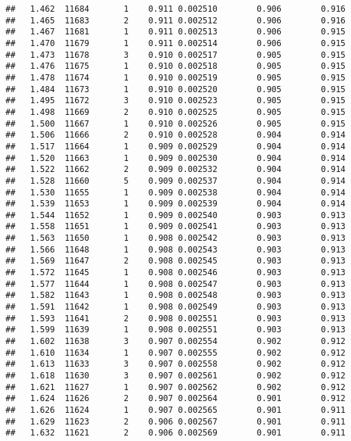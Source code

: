 \documentclass[
]{book}
\begin{document}
\begin{verbatim}
##   1.462  11684       1    0.911 0.002510        0.906        0.916
##   1.465  11683       2    0.911 0.002512        0.906        0.916
##   1.467  11681       1    0.911 0.002513        0.906        0.915
##   1.470  11679       1    0.911 0.002514        0.906        0.915
##   1.473  11678       3    0.910 0.002517        0.905        0.915
##   1.476  11675       1    0.910 0.002518        0.905        0.915
##   1.478  11674       1    0.910 0.002519        0.905        0.915
##   1.484  11673       1    0.910 0.002520        0.905        0.915
##   1.495  11672       3    0.910 0.002523        0.905        0.915
##   1.498  11669       2    0.910 0.002525        0.905        0.915
##   1.500  11667       1    0.910 0.002526        0.905        0.915
##   1.506  11666       2    0.910 0.002528        0.904        0.914
##   1.517  11664       1    0.909 0.002529        0.904        0.914
##   1.520  11663       1    0.909 0.002530        0.904        0.914
##   1.522  11662       2    0.909 0.002532        0.904        0.914
##   1.528  11660       5    0.909 0.002537        0.904        0.914
##   1.530  11655       1    0.909 0.002538        0.904        0.914
##   1.539  11653       1    0.909 0.002539        0.904        0.914
##   1.544  11652       1    0.909 0.002540        0.903        0.913
##   1.558  11651       1    0.909 0.002541        0.903        0.913
##   1.563  11650       1    0.908 0.002542        0.903        0.913
##   1.566  11648       1    0.908 0.002543        0.903        0.913
##   1.569  11647       2    0.908 0.002545        0.903        0.913
##   1.572  11645       1    0.908 0.002546        0.903        0.913
##   1.577  11644       1    0.908 0.002547        0.903        0.913
##   1.582  11643       1    0.908 0.002548        0.903        0.913
##   1.591  11642       1    0.908 0.002549        0.903        0.913
##   1.593  11641       2    0.908 0.002551        0.903        0.913
##   1.599  11639       1    0.908 0.002551        0.903        0.913
##   1.602  11638       3    0.907 0.002554        0.902        0.912
##   1.610  11634       1    0.907 0.002555        0.902        0.912
##   1.613  11633       3    0.907 0.002558        0.902        0.912
##   1.618  11630       3    0.907 0.002561        0.902        0.912
##   1.621  11627       1    0.907 0.002562        0.902        0.912
##   1.624  11626       2    0.907 0.002564        0.901        0.912
##   1.626  11624       1    0.907 0.002565        0.901        0.911
##   1.629  11623       2    0.906 0.002567        0.901        0.911
##   1.632  11621       2    0.906 0.002569        0.901        0.911

\end{verbatim}
\end{document}
